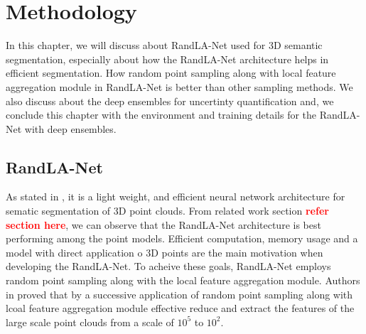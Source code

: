 
\chapter{Methodology}
In this chapter, we will discuss about RandLA-Net used for 3D semantic segmentation, 
especially about how the RandLA-Net architecture helps in efficient segmentation.
How random point sampling along with local feature aggregation module in RandLA-Net is better than other sampling methods.
We also discuss about the deep ensembles for uncertinty quantification and, we conclude this chapter with the environment and training details for the RandLA-Net with deep ensembles.
\section{RandLA-Net}
As stated in \cite{Hu_2020_CVPR_Randla}, it is a light weight, and efficient neural network architecture for sematic segmentation of 3D point clouds.
From related work section \textcolor{red}{\textbf{refer section here}}, we can observe that the RandLA-Net architecture is best performing among the point models.
Efficient computation, memory usage and a model with direct application o 3D points are the main motivation when developing the RandLA-Net.
To acheive these goals, RandLA-Net employs random point sampling along with the local feature aggregation module.
Authors in \cite{Hu_2020_CVPR_Randla} proved that by a successive application of random point sampling along with lcoal feature aggregation module effective reduce and extract the features of the large scale point clouds from a scale of $10^5$ to $10^2$.

